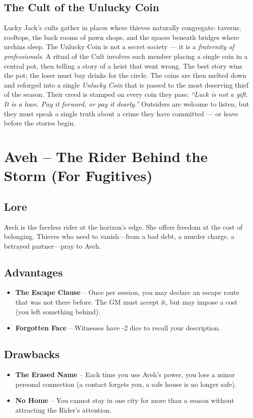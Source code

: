 \documentclass[10pt,twoside]{book}
\begin{document}
\section{The Cult of the Unlucky Coin}
Lucky Jack's cults gather in places where thieves naturally congregate: taverns, rooftops, the back rooms of pawn shops, and the spaces beneath bridges where urchins sleep. The Unlucky Coin is not a secret society --- it is a \textit{fraternity of professionals}. A ritual of the Cult involves each member placing a single coin in a central pot, then telling a story of a heist that went wrong. The best story wins the pot; the loser must buy drinks for the circle. The coins are then melted down and reforged into a single \textit{Unlucky Coin} that is passed to the most deserving thief of the season. Their creed is stamped on every coin they pass: \textit{``Luck is not a gift. It is a loan. Pay it forward, or pay it dearly.''} Outsiders are welcome to listen, but they must speak a single truth about a crime they have committed --- or leave before the stories begin.

\chapter{Aveh -- The Rider Behind the Storm (For Fugitives)}

\section{Lore}
Aveh is the faceless rider at the horizon's edge. She offers freedom at the cost of belonging. Thieves who need to vanish---from a bad debt, a murder charge, a betrayed partner---pray to Aveh.

\section{Advantages}
\begin{itemize}
\item \textbf{The Escape Clause} -- Once per session, you may declare an escape route that was not there before. The GM must accept it, but may impose a cost (you left something behind).
\item \textbf{Forgotten Face} -- Witnesses have -2 dice to recall your description.
\end{itemize}

\section{Drawbacks}
\begin{itemize}
\item \textbf{The Erased Name} -- Each time you use Aveh's power, you lose a minor personal connection (a contact forgets you, a safe house is no longer safe).
\item \textbf{No Home} -- You cannot stay in one city for more than a season without attracting the Rider's attention.
\end{itemize}
\end{document}
